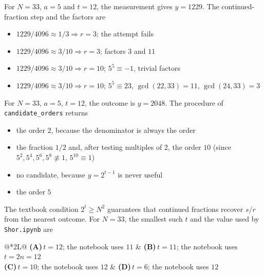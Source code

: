 \documentclass[11pt,a4paper]{article}
\newcommand{\optlabel}[1]{\textbf{(#1)}}
\newenvironment{qitem}[1]{\begin{list}{}{\setlength{\leftmargin}{3.3em}\setlength{\labelwidth}{3.1em}%
  \setlength{\labelsep}{0.2em}\setlength{\topsep}{3pt}\setlength{\parsep}{3pt}}\item[\textbf{Q.#1}\hfill]}{\end{list}}
\newcommand{\qsep}{\par\vspace{2pt}{\color{black!15}\hrule}\vspace{4pt}}
\begin{document}
\begin{qitem}{48}
For $N = 33$, $a = 5$ and $t = 12$, the measurement gives $y = 1229$. The continued-fraction step and the factors are
\begin{itemize}[leftmargin=2.6em, labelsep=0.4em, itemsep=2pt, topsep=3pt]
\item[\optlabel{A}] $1229/4096 \approx 1/3 \Rightarrow r = 3$; the attempt fails
\item[\optlabel{B}] $1229/4096 \approx 3/10 \Rightarrow r = 3$; factors $3$ and $11$
\item[\optlabel{C}] $1229/4096 \approx 3/10 \Rightarrow r = 10$; $5^5 \equiv -1$, trivial factors
\item[\optlabel{D}] $1229/4096 \approx 3/10 \Rightarrow r = 10$; $5^5 \equiv 23$, $\gcd(22, 33) = 11$, $\gcd(24, 33) = 3$
\end{itemize}
\end{qitem}
\qsep

\begin{qitem}{49}
For $N = 33$, $a = 5$, $t = 12$, the outcome is $y = 2048$. The procedure of \texttt{candidate\_orders} returns
\begin{itemize}[leftmargin=2.6em, labelsep=0.4em, itemsep=2pt, topsep=3pt]
\item[\optlabel{A}] the order $2$, because the denominator is always the order
\item[\optlabel{B}] the fraction $1/2$ and, after testing multiples of $2$, the order $10$ (since $5^2, 5^4, 5^6, 5^8 \not\equiv 1$, $5^{10} \equiv 1$)
\item[\optlabel{C}] no candidate, because $y = 2^{t-1}$ is never useful
\item[\optlabel{D}] the order $5$
\end{itemize}
\end{qitem}
\qsep

\begin{qitem}{50}
The textbook condition $2^t \ge N^2$ guarantees that continued fractions recover $s/r$ from the nearest outcome. For $N = 33$, the smallest such
$t$ and the value used by \texttt{Shor.ipynb} are
\par\smallskip\noindent\begin{tabularx}{\linewidth}{@{}*{2}{L}@{}}
\optlabel{A}\,$t = 12$; the notebook uses $11$ & \optlabel{B}\,$t = 11$; the notebook uses $t = 2n = 12$ \\[3pt]
\optlabel{C}\,$t = 10$; the notebook uses $12$ & \optlabel{D}\,$t = 6$; the notebook uses $12$
\end{tabularx}
\end{qitem}
\qsep
\end{document}
